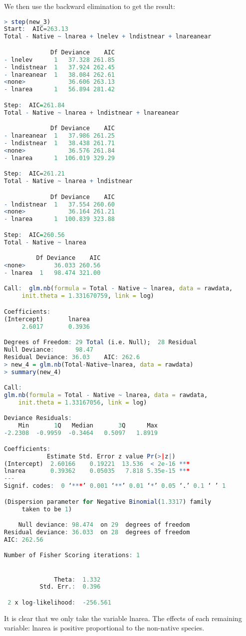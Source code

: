 \documentclass[12pt,a4paper]{article}
\begin{document}
We then use the backward elimination to get the result:
\begin{lstlisting}[language =R]
> step(new_3)
Start:  AIC=263.13
Total - Native ~ lnarea + lnelev + lndistnear + lnareanear

             Df Deviance    AIC
- lnelev      1   37.328 261.85
- lndistnear  1   37.924 262.45
- lnareanear  1   38.084 262.61
<none>            36.606 263.13
- lnarea      1   56.894 281.42

Step:  AIC=261.84
Total - Native ~ lnarea + lndistnear + lnareanear

             Df Deviance    AIC
- lnareanear  1   37.986 261.25
- lndistnear  1   38.438 261.71
<none>            36.576 261.84
- lnarea      1  106.019 329.29

Step:  AIC=261.21
Total - Native ~ lnarea + lndistnear

             Df Deviance    AIC
- lndistnear  1   37.554 260.60
<none>            36.164 261.21
- lnarea      1  100.839 323.88

Step:  AIC=260.56
Total - Native ~ lnarea

         Df Deviance    AIC
<none>        36.033 260.56
- lnarea  1   98.474 321.00

Call:  glm.nb(formula = Total - Native ~ lnarea, data = rawdata, 
     init.theta = 1.331670759, link = log)

Coefficients:
(Intercept)       lnarea  
     2.6017       0.3936  

Degrees of Freedom: 29 Total (i.e. Null);  28 Residual
Null Deviance:	    98.47 
Residual Deviance: 36.03 	AIC: 262.6
> new_4 = glm.nb(Total-Native~lnarea, data = rawdata) 
> summary(new_4) 

Call:
glm.nb(formula = Total - Native ~ lnarea, data = rawdata, 
    init.theta = 1.33167056, link = log)

Deviance Residuals: 
    Min       1Q   Median       3Q      Max  
-2.2308  -0.9959  -0.3464   0.5097   1.8919  

Coefficients:
            Estimate Std. Error z value Pr(>|z|)    
(Intercept)  2.60166    0.19221  13.536  < 2e-16 ***
lnarea       0.39362    0.05035   7.818 5.35e-15 ***
---
Signif. codes:  0 ‘***’ 0.001 ‘**’ 0.01 ‘*’ 0.05 ‘.’ 0.1 ‘ ’ 1

(Dispersion parameter for Negative Binomial(1.3317) family 
     taken to be 1)

    Null deviance: 98.474  on 29  degrees of freedom
Residual deviance: 36.033  on 28  degrees of freedom
AIC: 262.56

Number of Fisher Scoring iterations: 1


              Theta:  1.332 
          Std. Err.:  0.396 

 2 x log-likelihood:  -256.561 
\end{lstlisting}
It is clear that we only take the variable lnarea. The eﬀects of each remaining variable: lnarea is positive proportional to the non-native species.
\end{document}
